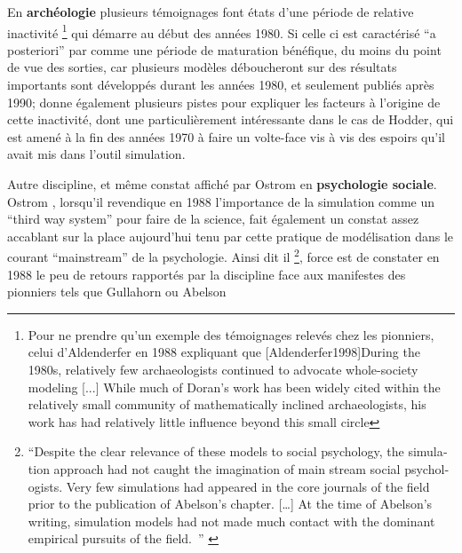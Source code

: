 En \textbf{archéologie} plusieurs témoignages \autocite[6-7]{Lake2013} font états d'une période de relative inactivité \footnote{Pour ne prendre qu'un exemple des témoignages relevés chez les pionniers, celui d'Aldenderfer en 1988 expliquant que [Aldenderfer1998]{During the 1980s, relatively few archaeologists continued to advocate whole-society modeling [...] While much of Doran's work has been widely cited within the relatively small community of mathematically inclined archaeologists, his work has had relatively little influence beyond this small circle}} qui démarre au début des années 1980. Si celle ci est caractérisé \enquote{a posteriori} par \autocite{Lake2013} comme une période de maturation bénéfique, du moins du point de vue des sorties, car plusieurs modèles déboucheront sur des résultats importants sont développés durant les années 1980, et seulement publiés après 1990; \autocite{Lake2013} donne également plusieurs pistes pour expliquer les facteurs à l'origine de cette inactivité, dont une particulièrement intéressante dans le cas de Hodder, qui est amené à la fin des années 1970 à faire un volte-face vis à vis des espoirs qu'il avait mis dans l'outil simulation.

Autre discipline, et même constat affiché par Ostrom en \textbf{psychologie sociale}. Ostrom \autocite{Ostrom1988}, lorsqu'il revendique en 1988 l'importance de la simulation comme un \foreignquote{english}{third way system} pour faire de la science,  fait également un constat assez accablant sur la place aujourd'hui tenu par cette pratique de modélisation dans le courant \foreignquote{english}{mainstream} de la psychologie. Ainsi dit il \footnote{ \foreignquote{english}{Despite the clear relevance of these models to  social psychology, the simulation approach had not caught the imagination of main stream social psychologists. Very few simulations had appeared in the core journals of the field prior to the publication of Abelson's chapter. […] At the time of Abelson's writing, simulation models had not made much contact with the dominant empirical pursuits of the field. } \autocite[382]{Ostrom1988}}, force est de constater en 1988 le peu de retours rapportés par la discipline face aux manifestes des pionniers tels que Gullahorn \autocite{Gullahorn1965} ou Abelson \autocite{Abelson1968} 

